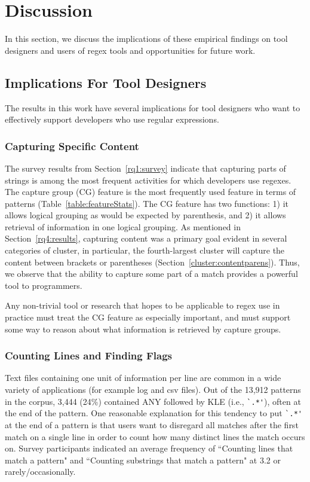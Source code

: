 \section{Discussion}
\label{sec:discussion}

In this section, we discuss the implications of these empirical findings on tool designers and users of regex tools and opportunities for future work.

\subsection{Implications For Tool Designers}
The results in this work have several implications for tool designers who want to effectively support developers who use regular expressions.

\subsubsection{Capturing Specific Content}
The survey results from Section~\ref{rq1:survey} indicate that capturing parts of strings is among the most frequent activities for which developers use regexes.
The capture group (CG) feature is the most frequently used feature in terms of patterns (Table~\ref{table:featureStats}).  The CG feature has two functions: 1) it allows logical grouping as would be expected by parenthesis, and 2) it allows retrieval of information in one logical grouping.  As mentioned in Section~\ref{rq4:results}, capturing content was a primary goal evident in several categories of cluster, in particular, the fourth-largest cluster will capture the content between brackets or parentheses (Section~\ref{cluster:contentparens}).  Thus, we observe that the ability to capture some part of a match provides a powerful tool to programmers.

Any non-trivial tool or research that hopes to be applicable to regex use in practice must treat the CG feature as especially important, and must support some way to reason about what information is retrieved by capture groups.

\subsubsection{Counting Lines and Finding Flags}
Text files containing one unit of information per line are common in a wide variety of applications (for example log and csv files).  Out of the 13,912 patterns in the corpus, 3,444 (24\%) contained ANY followed by KLE  (i.e., \verb!`.*'!), often at the end of the pattern.
One reasonable explanation for this tendency to put \verb!`.*'! at the end of a pattern is that users want to disregard all matches after the first match on a single line in order to count how many distinct lines the match occurs on.  Survey participants indicated an average frequency of ``Counting lines that match a pattern" and ``Counting substrings that match a pattern" at 3.2 or rarely/occasionally.


